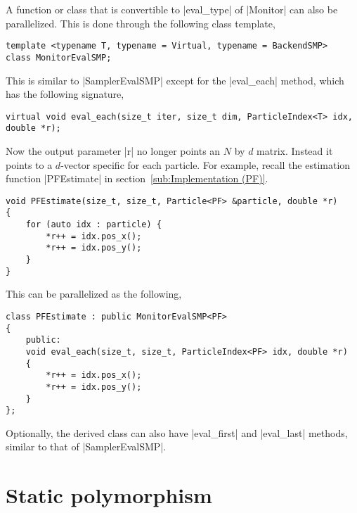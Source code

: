 A function or class that is convertible to |eval_type| of |Monitor| can also be
parallelized. This is done through the following class template,
\begin{verbatim}
template <typename T, typename = Virtual, typename = BackendSMP>
class MonitorEvalSMP;
\end{verbatim}
This is similar to |SamplerEvalSMP| except for the |eval_each| method, which
has the following signature,
\begin{verbatim}
virtual void eval_each(size_t iter, size_t dim, ParticleIndex<T> idx, double *r);
\end{verbatim}
Now the output parameter |r| no longer points an $N$ by $d$ matrix. Instead it
points to a $d$-vector specific for each particle. For example, recall the
estimation function |PFEstimate| in
section~\ref{sub:Implementation (PF)}.
\begin{verbatim}
void PFEstimate(size_t, size_t, Particle<PF> &particle, double *r)
{
    for (auto idx : particle) {
        *r++ = idx.pos_x();
        *r++ = idx.pos_y();
    }
}
\end{verbatim}
This can be parallelized as the following,
\begin{verbatim}
class PFEstimate : public MonitorEvalSMP<PF>
{
    public:
    void eval_each(size_t, size_t, ParticleIndex<PF> idx, double *r)
    {
        *r++ = idx.pos_x();
        *r++ = idx.pos_y();
    }
};
\end{verbatim}
Optionally, the derived class can also have |eval_first| and |eval_last|
methods, similar to that of |SamplerEvalSMP|.

\section{Static polymorphism}
\label{sec:Static polymorphism}

